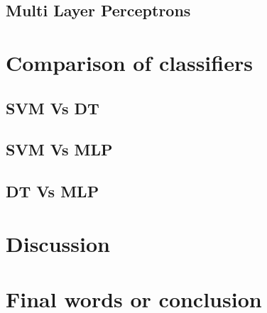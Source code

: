 \documentclass{article}
\begin{document}
\begin{multicols}{2}
\subsection{Multi Layer Perceptrons}



\section{Comparison of classifiers}
\subsection{SVM Vs DT} %

\subsection{SVM Vs MLP} %

\subsection{DT Vs MLP}


\section{Discussion}
\section{Final words or conclusion}

%
\end{multicols}

\newpage



\end{document}
